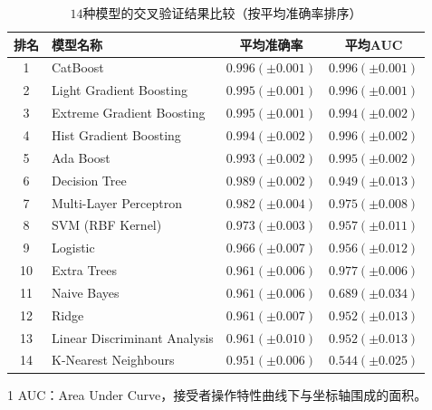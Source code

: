\begin{table}[htb]
    \centering
    \scriptsize
    \begin{threeparttable}
        \begin{tabular}{clcc}
            \toprule
            排名 & 模型名称                         & 平均准确率               & 平均AUC\tnote{1}      \\
            \midrule
            1  & CatBoost                     & $0.996 (\pm 0.001)$ & $0.996 (\pm 0.001)$ \\
            2  & Light Gradient Boosting      & $0.995 (\pm 0.001)$ & $0.996 (\pm 0.001)$ \\
            3  & Extreme Gradient Boosting    & $0.995 (\pm 0.001)$ & $0.994 (\pm 0.002)$ \\
            4  & Hist Gradient Boosting       & $0.994 (\pm 0.002)$ & $0.996 (\pm 0.002)$ \\
            5  & Ada Boost                    & $0.993 (\pm 0.002)$ & $0.995 (\pm 0.002)$ \\
            6  & Decision Tree                & $0.989 (\pm 0.002)$ & $0.949 (\pm 0.013)$ \\
            7  & Multi-Layer Perceptron       & $0.982 (\pm 0.004)$ & $0.975 (\pm 0.008)$ \\
            8  & SVM (RBF Kernel)             & $0.973 (\pm 0.003)$ & $0.957 (\pm 0.011)$ \\
            9  & Logistic                     & $0.966 (\pm 0.007)$ & $0.956 (\pm 0.012)$ \\
            10 & Extra Trees                  & $0.961 (\pm 0.006)$ & $0.977 (\pm 0.006)$ \\
            11 & Naive Bayes                  & $0.961 (\pm 0.006)$ & $0.689 (\pm 0.034)$ \\
            12 & Ridge                        & $0.961 (\pm 0.007)$ & $0.952 (\pm 0.013)$ \\
            13 & Linear Discriminant Analysis & $0.961 (\pm 0.010)$ & $0.952 (\pm 0.013)$ \\
            14 & K-Nearest Neighbours         & $0.951 (\pm 0.006)$ & $0.544 (\pm 0.025)$ \\
            \bottomrule
        \end{tabular}
        \begin{tablenotes}
            \tiny
            \item[1] AUC：Area Under Curve，接受者操作特性曲线下与坐标轴围成的面积。
        \end{tablenotes}
    \end{threeparttable}
    \caption{$14$种模型的交叉验证结果比较（按平均准确率排序）}
    \label{table:model-comparison}
\end{table}

